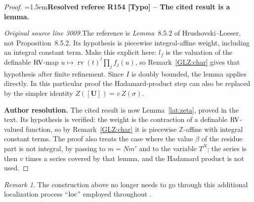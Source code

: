 \documentclass[12pt]{amsart}
\newcommand{\ResolvedRefereeRemark}[5]{%
  \par\medskip\begingroup\normalfont\small\color{gray}%
  \emergencystretch=1.5em\noindent\textbf{Resolved referee R#1 [#2] -- #3.}\par\nobreak\noindent #4\par
  \medskip\color{ResolutionGreen}\noindent\textbf{Author resolution.} #5\par
  \endgroup\medskip
}
\theoremstyle{plain}
\theoremstyle{definition}
\theoremstyle{remark}
\newtheorem{rem}[thm]{Remark}
\numberwithin{equation}{section}
\theoremstyle{plain}
\newcommand{\RV}{\textup{RV}}
\newcommand{\Z}{\mathds{Z}}
\newcommand{\0}{\emptyset}
\DeclareMathOperator{\rv}{rv}
\newcommand{\loc}{\textup{loc}}
\begin{document}
\begin{proof}
\ResolvedRefereeRemark{154}{Typo}{The cited result is a lemma}{%
\textit{Original source line 3009.}\quad The reference is \emph{Lemma}~8.5.2 of Hrushovski--Loeser, not Proposition~8.5.2. Its hypothesis is piecewise integral-affine weight, including an integral constant term. Make this explicit here: $l_f$ is the valuation of the definable $\RV$-map $u\mapsto\rv(t)^l\prod_j f_j(u)$, so Remark~\ref{GLZ:char} gives that hypothesis after finite refinement. Since $I$ is doubly bounded, the lemma applies directly. In this particular proof the Hadamard-product step can also be replaced by the simpler identity $Z([\bm U])=v\,Z(\sigma)$.
}{The cited result is now Lemma~\ref{lat:zeta}, proved in the text. Its hypothesis is verified: the weight is the contraction of a definable $\RV$-valued function, so by Remark~\ref{GLZ:char} it is piecewise $\Z$-affine with integral constant terms. The proof also treats the case where the value $\beta$ of the residue part is not integral, by passing to $m=Nm'$ and to the variable $T^N$; the series is then $v$ times a series covered by that lemma, and the Hadamard product is not used.}
\end{proof}


\begin{rem}
The construction above no longer needs to go through this additional localization process ``$\loc$'' employed throughout \cite[\S~8]{hru:loe:lef}.
\end{rem}
\end{document}
